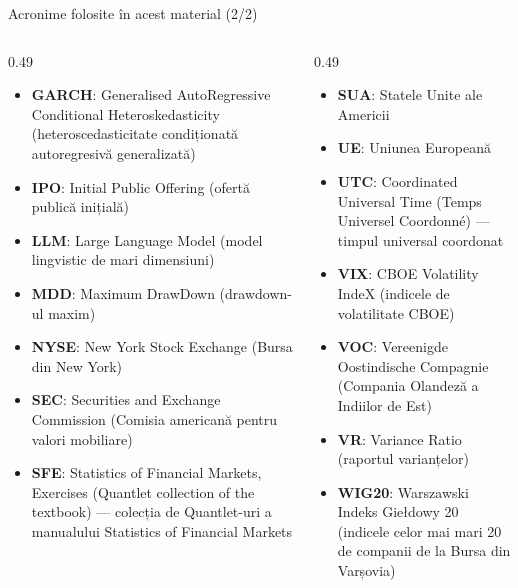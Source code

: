 \begin{frame}{Acronime folosite în acest material (2/2)}
\begin{columns}[T]
\begin{column}{0.49\textwidth}
\begin{itemize}\setlength{\itemsep}{0pt}
    \item \textbf{GARCH}: Generalised AutoRegressive Conditional Heteroskedasticity (heteroscedasticitate condiționată autoregresivă generalizată)
    \item \textbf{IPO}: Initial Public Offering (ofertă publică inițială)
    \item \textbf{LLM}: Large Language Model (model lingvistic de mari dimensiuni)
    \item \textbf{MDD}: Maximum DrawDown (drawdown-ul maxim)
    \item \textbf{NYSE}: New York Stock Exchange (Bursa din New York)
    \item \textbf{SEC}: Securities and Exchange Commission (Comisia americană pentru valori mobiliare)
    \item \textbf{SFE}: Statistics of Financial Markets, Exercises (Quantlet collection of the textbook) — colecția de Quantlet-uri a manualului Statistics of Financial Markets
\end{itemize}
\end{column}
\begin{column}{0.49\textwidth}
\begin{itemize}\setlength{\itemsep}{0pt}
    \item \textbf{SUA}: Statele Unite ale Americii
    \item \textbf{UE}: Uniunea Europeană
    \item \textbf{UTC}: Coordinated Universal Time (Temps Universel Coordonné) — timpul universal coordonat
    \item \textbf{VIX}: CBOE Volatility IndeX (indicele de volatilitate CBOE)
    \item \textbf{VOC}: Vereenigde Oostindische Compagnie (Compania Olandeză a Indiilor de Est)
    \item \textbf{VR}: Variance Ratio (raportul varianțelor)
    \item \textbf{WIG20}: Warszawski Indeks Giełdowy 20 (indicele celor mai mari 20 de companii de la Bursa din Varșovia)
\end{itemize}
\end{column}
\end{columns}
\end{frame}

